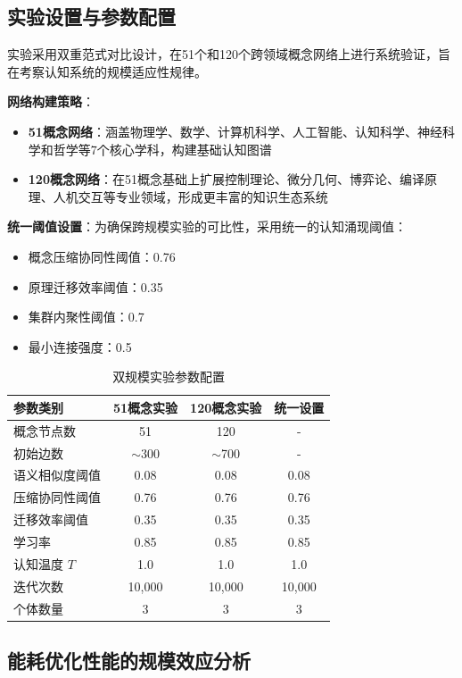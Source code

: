 \documentclass[12pt,a4paper]{article}
\begin{document}
\subsection{实验设置与参数配置}

实验采用双重范式对比设计，在51个和120个跨领域概念网络上进行系统验证，旨在考察认知系统的规模适应性规律。

\textbf{网络构建策略}：
\begin{itemize}
\item \textbf{51概念网络}：涵盖物理学、数学、计算机科学、人工智能、认知科学、神经科学和哲学等7个核心学科，构建基础认知图谱
\item \textbf{120概念网络}：在51概念基础上扩展控制理论、微分几何、博弈论、编译原理、人机交互等专业领域，形成更丰富的知识生态系统
\end{itemize}

\textbf{统一阈值设置}：为确保跨规模实验的可比性，采用统一的认知涌现阈值：
\begin{itemize}
\item 概念压缩协同性阈值：0.76
\item 原理迁移效率阈值：0.35  
\item 集群内聚性阈值：0.7
\item 最小连接强度：0.5
\end{itemize}

\begin{table}[h]
\centering
\caption{双规模实验参数配置}
\label{tab:dual_scale_config}
\begin{tabular}{lccc}
\toprule
\textbf{参数类别} & \textbf{51概念实验} & \textbf{120概念实验} & \textbf{统一设置} \\
\midrule
概念节点数 & 51 & 120 & - \\
初始边数 & $\sim$300 & $\sim$700 & - \\
语义相似度阈值 & 0.08 & 0.08 & 0.08 \\
压缩协同性阈值 & 0.76 & 0.76 & 0.76 \\
迁移效率阈值 & 0.35 & 0.35 & 0.35 \\
学习率 & 0.85 & 0.85 & 0.85 \\
认知温度 $T$ & 1.0 & 1.0 & 1.0 \\
迭代次数 & 10,000 & 10,000 & 10,000 \\
个体数量 & 3 & 3 & 3 \\
\bottomrule
\end{tabular}
\end{table}

\subsection{能耗优化性能的规模效应分析}
\end{document}
